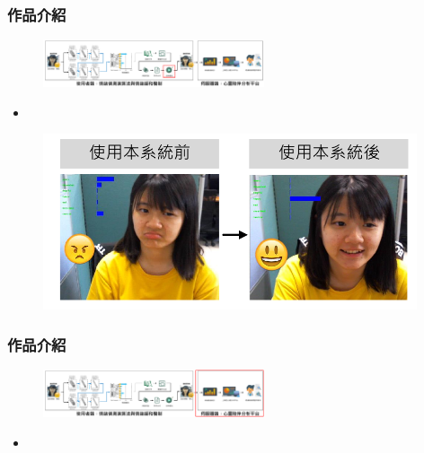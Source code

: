 \documentclass[10pt, conference, compsocconf]{beamer}
\begin{document}
\begin{CJK}{UTF8}{}
\begin{frame}
\frametitle{作品介紹}

\vspace{-3mm}
\begin{figure}[t]
\begin{flushright}
\includegraphics[width=6.5cm]{./Figures/framework_version4_8.pdf}
\end{flushright}
\end{figure}

\vspace{-5mm}

\begin{itemize}
\item {}
\end{itemize}

\begin{figure}[!t]
\begin{center}
\includegraphics[width=11cm]{./Figures/result.pdf}
\end{center}
\end{figure}
\end{frame}


\begin{frame}
\frametitle{作品介紹}

\vspace{-3mm}
\begin{figure}[t]
\begin{flushright}
\includegraphics[width=6.5cm]{./Figures/framework_version4_9.pdf}
\end{flushright}
\end{figure}
\begin{itemize}
\item {}
\end{itemize}
\vspace{-8mm}


\end{frame}
\end{CJK}
\end{document}
